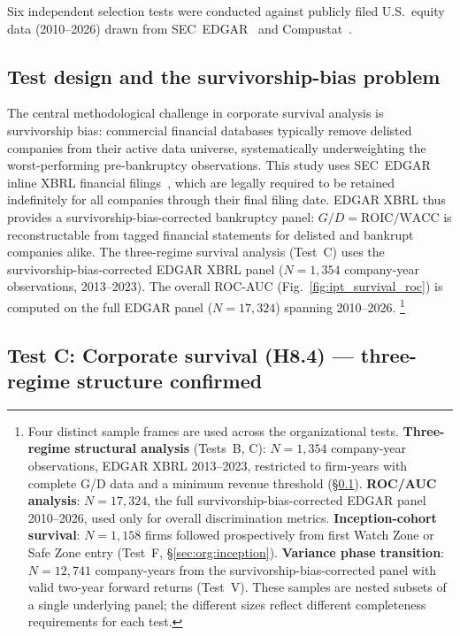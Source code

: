 \documentclass[11pt]{article}
\theoremstyle{remark}
\begin{document}
Six independent selection tests were conducted against publicly filed U.S.\ equity
data (2010--2026) drawn from SEC~EDGAR~\cite{SECEDGAR} and
Compustat~\cite{CompustatFinancials}.

\subsection{Test design and the survivorship-bias problem}
\label{sec:org:design}

The central methodological challenge in corporate survival analysis is
survivorship bias: commercial financial databases typically remove delisted
companies from their active data universe, systematically underweighting
the worst-performing pre-bankruptcy observations.
This study uses SEC~EDGAR inline XBRL financial filings~\cite{SECEDGAR},
which are legally required to be retained indefinitely for all companies
through their final filing date.
EDGAR XBRL thus provides a survivorship-bias-corrected bankruptcy panel:
$G/D = \mathrm{ROIC}/\mathrm{WACC}$ is reconstructable from tagged
financial statements for delisted and bankrupt companies alike.
The three-regime survival analysis (Test~C) uses the survivorship-bias-corrected
EDGAR XBRL panel ($N = 1{,}354$ company-year observations, 2013--2023).
The overall ROC-AUC (Fig.~\ref{fig:ipt_survival_roc}) is computed on the full
EDGAR panel ($N = 17{,}324$) spanning 2010--2026.%
\footnote{Four distinct sample frames are used across the organizational tests.
\textbf{Three-regime structural analysis} (Tests~B, C): $N = 1{,}354$
company-year observations, EDGAR XBRL 2013--2023, restricted to firm-years with
complete G/D data and a minimum revenue threshold (\S\ref{sec:org:design}).
\textbf{ROC/AUC analysis}: $N = 17{,}324$, the full survivorship-bias-corrected
EDGAR panel 2010--2026, used only for overall discrimination metrics.
\textbf{Inception-cohort survival}: $N = 1{,}158$ firms followed prospectively
from first Watch Zone or Safe Zone entry (Test~F, \S\ref{sec:org:inception}).
\textbf{Variance phase transition}: $N = 12{,}741$ company-years from the
survivorship-bias-corrected panel with valid two-year forward returns (Test~V).
These samples are nested subsets of a single underlying panel; the different
sizes reflect different completeness requirements for each test.}

\subsection{Test C: Corporate survival (H8.4) --- three-regime structure confirmed}
\label{sec:org:survival}
\end{document}
